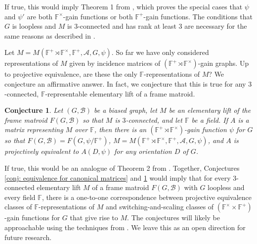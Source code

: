 \documentclass[12pt]{article}
\newtheorem{conjecture}[theorem]{Conjecture}
\theoremstyle{definition}
\newcommand{\bF}{\mathbb F}
\newcommand{\cA}{\mathcal{A}}
\newcommand{\cB}{\mathcal{B}}
\begin{document}
If true, this would imply Theorem 1 from \cite{Funk-Pivotto-Slilaty-2022}, which proves the special cases that $\psi$ and $\psi'$ are both $\bF^{\times}$-gain functions or both $\bF^+$-gain functions.
The conditions that $G$ is loopless and $M$ is $3$-connected and has rank at least $3$ are necessary for the same reasons as described in \cite{Funk-Pivotto-Slilaty-2022}.


Let $M = M(\bF^+ \rtimes \bF^{\times}, \bF^+, \cA, G, \psi)$.
So far we have only considered representations of $M$ given by incidence matrices of $(\bF^+ \rtimes \bF^{\times})$-gain graphs.
Up to projective equivalence, are these the only $\bF$-representations of $M$?
We conjecture an affirmative answer.
In fact, we conjecture that this is true for any $3$-connected, $\bF$-representable elementary lift of a frame matroid.

\begin{conjecture} \label{conj: representable implies incidence matrix of gain function}
Let $(G, \cB)$ be a biased graph, let $M$ be an elementary lift of the frame matroid $F(G, \cB)$ so that $M$ is $3$-connected, and let $\bF$ be a field.
If $A$ is a matrix representing $M$ over $\bF$, then there is an $(\bF^+ \rtimes \bF^{\times})$-gain function $\psi$ for $G$ so that $F(G, \cB) = F(G, \psi/\bF^+)$, $M = M(\bF^+ \rtimes \bF^{\times}, \bF^+, \cA, G, \psi)$, and $A$ is projectively equivalent to $A(D, \psi)$ for any orientation $D$ of $G$.
\end{conjecture}

If true, this would be an analogue of Theorem 2 from \cite{Funk-Pivotto-Slilaty-2022}.
Together, Conjectures \ref{conj: equivalence for canonical matrices} and \ref{conj: representable implies incidence matrix of gain function} would imply that for every $3$-connected elementary lift $M$ of a frame matroid $F(G, \cB)$ with $G$ loopless and every field $\bF$, there is a one-to-one correspondence between projective equivalence classes of $\bF$-representations of $M$ and switching-and-scaling classes of $(\bF^{\times} \times \bF^+)$-gain functions for $G$ that give rise to $M$.
The conjectures will likely be approachable using the techniques from \cite{Funk-Pivotto-Slilaty-2022}.
We leave this as an open direction for future research.
\end{document}
